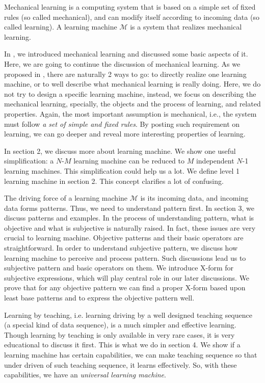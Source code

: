 Mechanical learning is a computing system that is based on a simple set of fixed rules (so called mechanical), and can modify itself according to incoming data (so called learning). A learning machine $\mathcal{M}$ is a system that realizes mechanical learning. 

In \cite{paper1}, we introduced mechanical learning and discussed some basic aspects of it. Here, we are going to continue the discussion of mechanical learning. As we proposed in \cite{paper1}, there are naturally 2 ways to go: to directly realize one learning machine, or to well describe what mechanical learning is really doing. Here, we do not try to design a specific learning machine, instead, we focus on describing the mechanical learning, specially, the objects and the process of learning, and related properties. Again, the most important assumption is mechanical, i.e., the system must follow {\it a set of simple and fixed rules}. By posting such requirement on learning, we can go deeper and reveal more interesting properties of learning.   

In section 2, we discuss more about learning machine. We show one useful simplification: a $N$-$M$ learning machine can be reduced to $M$ independent $N$-1 learning machines. This simplification could help us a lot. We define level 1 learning machine in section 2. This concept clarifies a lot of confusing.

The driving force of a learning machine $\mathcal{M}$ is its incoming data, and incoming data forms patterns. Thus, we need to understand pattern first. In section 3, we discuss patterns and examples. In the process of understanding pattern, what is objective and what is subjective is naturally raised. In fact, these issues are very crucial to learning machine. Objective patterns and their basic operators are straightforward. In order to understand subjective pattern, we discuss how learning machine to perceive and process pattern. Such discussions lead us to subjective pattern and basic operators on them. We introduce X-form for subjective expressions, which will play central role in our later discussions. We prove that for any objective pattern we can find a proper X-form based upon least base patterns and to express the objective pattern well. 

Learning by teaching, i.e. learning driving by a well designed teaching sequence (a special kind of data sequence), is a much simpler and effective learning. Though learning by teaching is only available in very rare cases, it is very educational to discuss it first. This is what we do in section 4. We show if a learning machine has certain capabilities, we can make teaching sequence so that under driven of such teaching sequence, it learns effectively. So, with these capabilities, we have an {\it universal learning machine}.

